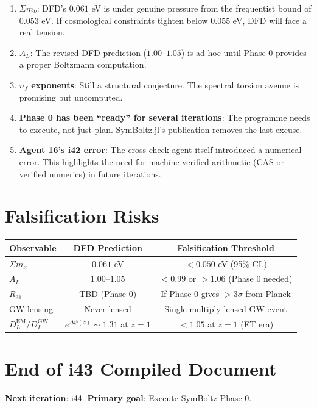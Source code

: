 \documentclass[11pt,a4paper]{article}
\begin{document}
\begin{enumerate}
\item \textbf{$\Sigma m_\nu$}: DFD's $0.061$ eV is under genuine pressure from the frequentist bound of $0.053$ eV. If cosmological constraints tighten below $0.055$ eV, DFD will face a real tension.
\item \textbf{$A_L$}: The revised DFD prediction ($1.00$--$1.05$) is ad hoc until Phase 0 provides a proper Boltzmann computation.
\item \textbf{$n_f$ exponents}: Still a structural conjecture. The spectral torsion avenue is promising but uncomputed.
\item \textbf{Phase 0 has been ``ready'' for several iterations}: The programme needs to execute, not just plan. SymBoltz.jl's publication removes the last excuse.
\item \textbf{Agent 16's i42 error}: The cross-check agent itself introduced a numerical error. This highlights the need for machine-verified arithmetic (CAS or verified numerics) in future iterations.
\end{enumerate}

\section{Falsification Risks}

\begin{center}
\begin{tabular}{lcc}
\toprule
\textbf{Observable} & \textbf{DFD Prediction} & \textbf{Falsification Threshold} \\
\midrule
$\Sigma m_\nu$ & $0.061$ eV & $< 0.050$ eV (95\% CL) \\
$A_L$ & $1.00$--$1.05$ & $< 0.99$ or $> 1.06$ (Phase 0 needed) \\
$R_{31}$ & TBD (Phase 0) & If Phase 0 gives $> 3\sigma$ from Planck \\
GW lensing & Never lensed & Single multiply-lensed GW event \\
$D_L^{\text{EM}}/D_L^{\text{GW}}$ & $e^{\Delta\psi(z)} \sim 1.31$ at $z=1$ & $< 1.05$ at $z = 1$ (ET era) \\
\bottomrule
\end{tabular}
\end{center}


\section*{End of i43 Compiled Document}

\textbf{Next iteration}: i44. \textbf{Primary goal}: Execute SymBoltz Phase 0.
\end{document}
